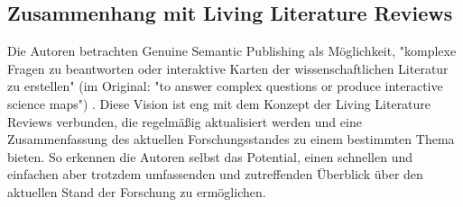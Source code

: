 \subsection{Zusammenhang mit Living Literature Reviews}
\label{subsec:zusammenhang-mit-living-literature-reviews}

Die Autoren betrachten Genuine Semantic Publishing als Möglichkeit, "komplexe Fragen zu beantworten oder interaktive Karten der wissenschaftlichen Literatur zu erstellen" (im Original: "to answer complex questions or produce interactive science maps") \cite{kuhn2017genuine}.
Diese Vision ist eng mit dem Konzept der Living Literature Reviews verbunden, die regelmäßig aktualisiert werden und eine Zusammenfassung des aktuellen Forschungsstandes zu einem bestimmten Thema bieten.
So erkennen die Autoren selbst das Potential, einen schnellen und einfachen aber trotzdem umfassenden und zutreffenden Überblick über den aktuellen Stand der Forschung zu ermöglichen.


